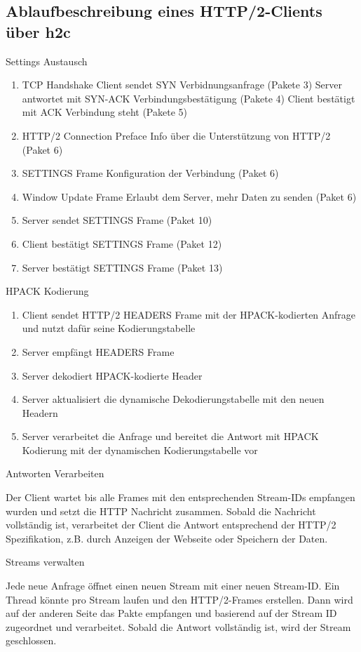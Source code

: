 \subsection{Ablaufbeschreibung eines HTTP/2-Clients über h2c}

Settings Austausch

\begin{enumerate}
    \item TCP Handshake
    \subitem Client sendet SYN \textrightarrow Verbidnungsanfrage (Pakete 3)
    \subitem Server antwortet mit SYN-ACK \textrightarrow Verbindungsbestätigung (Pakete 4)
    \subitem Client bestätigt mit ACK \textrightarrow Verbindung steht  (Pakete 5)
    \item HTTP/2 Connection Preface \textrightarrow Info über die Unterstützung von HTTP/2 (Paket 6)
    \item SETTINGS Frame \textrightarrow Konfiguration der Verbindung (Paket 6)
    \item Window Update Frame \textrightarrow Erlaubt dem Server, mehr Daten zu senden (Paket 6)
    \item Server sendet SETTINGS Frame (Paket 10)
    \item Client bestätigt SETTINGS Frame (Paket 12)
    \item Server bestätigt SETTINGS Frame (Paket 13)
\end{enumerate}

HPACK Kodierung

\begin{enumerate}
     \item Client sendet HTTP/2 HEADERS Frame mit der HPACK-kodierten Anfrage und nutzt dafür seine Kodierungstabelle
     \item Server empfängt HEADERS Frame 
     \item Server dekodiert HPACK-kodierte Header 
     \item Server aktualisiert die dynamische Dekodierungstabelle mit den neuen Headern
     \item Server verarbeitet die Anfrage und bereitet die Antwort mit HPACK Kodierung mit der dynamischen Kodierungstabelle vor
\end{enumerate}

Antworten Verarbeiten

Der Client wartet bis alle Frames mit den entsprechenden Stream-IDs empfangen wurden und setzt die HTTP Nachricht zusammen. Sobald die Nachricht vollständig ist, verarbeitet der Client die Antwort entsprechend der HTTP/2 Spezifikation, z.B. durch Anzeigen der Webseite oder Speichern der Daten.

Streams verwalten

Jede neue Anfrage öffnet einen neuen Stream mit einer neuen Stream-ID. Ein Thread könnte pro Stream laufen und den HTTP/2-Frames erstellen.
Dann wird auf der anderen Seite das Pakte empfangen und basierend auf der Stream ID zugeordnet und verarbeitet. Sobald die Antwort vollständig ist, wird der Stream geschlossen.